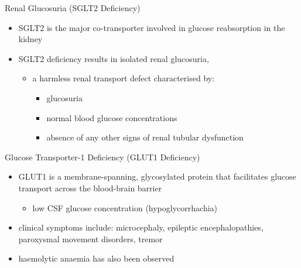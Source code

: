 \documentclass[presentation, smaller]{beamer}
\begin{document}
\begin{frame}[label={sec:org7c59be7}]{Renal Glucosuria (SGLT2 Deficiency)}
\begin{itemize}
\item SGLT2 is the major co-transporter involved in glucose reabsorption in
the kidney
\item SGLT2 deficiency results in isolated renal glucosuria,
\begin{itemize}
\item a harmless renal transport defect characterised by:
\begin{itemize}
\item glucosuria
\item normal blood glucose concentrations
\item absence of any other signs of renal tubular dysfunction
\end{itemize}
\end{itemize}
\end{itemize}
\end{frame}

\begin{frame}[label={sec:org670abb8}]{Glucose Transporter-1 Deficiency (GLUT1 Deficiency)}
\begin{itemize}
\item GLUT1 is a membrane-spanning, glycosylated protein that facilitates
glucose transport across the blood-brain barrier
\begin{itemize}
\item low CSF glucose concentration (hypoglycorrhachia)
\end{itemize}

\item clinical symptoms include: microcephaly, epileptic encephalopathies,
paroxysmal movement disorders, tremor
\item haemolytic anaemia has also been observed
\end{itemize}
\end{frame}
\end{document}
